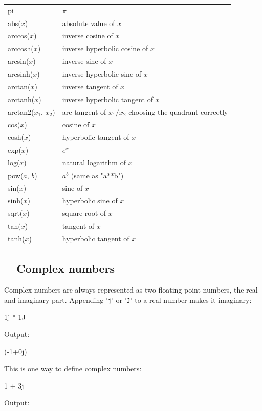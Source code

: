\begin{center}
\begin{tabular}{|l|l|}
\hline
pi &  $\pi$\\
abs($x$) &  absolute value of $x$\\
arccos($x$) &  inverse cosine of $x$ \\
arccosh($x$) &  inverse hyperbolic cosine of $x$ \\
arcsin($x$) & inverse sine of $x$ \\
arcsinh($x$) & inverse hyperbolic sine of $x$ \\
arctan($x$) & inverse tangent of $x$ \\
arctanh($x$) & inverse hyperbolic tangent of $x$ \\
arctan2($x_1$, $x_2$) & arc tangent of $x_1/x_2$ choosing the quadrant correctly \\
cos($x$) & cosine of $x$ \\
cosh($x$) & hyperbolic tangent of $x$ \\
exp($x$) & $e^x$ \\
log($x$) & natural logarithm of $x$ \\
pow($a$, $b$) & $a^b$ (same as "a**b")\\
sin($x$) & sine of $x$ \\
sinh($x$) & hyperbolic sine of $x$ \\
sqrt($x$) & square root of $x$ \\
tan($x$) & tangent of $x$\\
tanh($x$) & hyperbolic tangent of $x$ \\
\hline
\end{tabular}
\end{center}
\vspace{4mm}
\noindent

\subsection{\ \ Complex numbers}
Complex numbers are always represented as two floating point numbers, the 
real and imaginary part. Appending '{\tt j}' or  '{\tt J}' to a real number
makes it imaginary:

\begin{bluecode}
1j * 1J
\end{bluecode}
Output:

\begin{bluecode}
(-1+0j)
\end{bluecode}
This is one way to define complex numbers:
\begin{bluecode}
1 + 3j
\end{bluecode}
Output:

